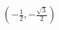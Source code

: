 \documentclass[preview]{standalone}
\begin{document}
\begin{align*}
\left(-\frac{1}{2}, -\frac{\sqrt{3}}{2}\right)
\end{align*}
\end{document}
